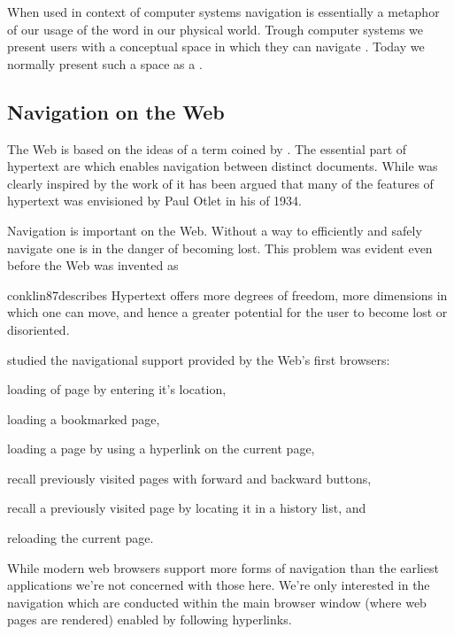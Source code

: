 When used in context of
computer systems navigation is essentially a metaphor of our usage of the
word in our physical world. Trough computer systems we present users with a
conceptual space in which they can navigate \citep[p.~189]{whiteside85}.
Today we normally present such a space as a %
.

\subsection{Navigation on the Web}
\label{section:background.navigation.navigation.on.the.web}

The Web is based on the ideas of \dash{}a term coined by
\citet[p.~86]{nelson65}. The essential part of hypertext are
 \citep[p.~90]{nelson65} which enables navigation between
distinct documents. While \citeauthor{nelson65} was clearly
inspired by the work of \citet{bush45} it has been argued \citep{rayward94}
that many of the features of hypertext was envisioned by Paul Otlet in his
 of 1934.

Navigation is important on the Web. Without a way to efficiently and safely
navigate one is in the danger of becoming lost. This problem was evident even
before the Web was invented as
\begin{fullquote}[p.~38]{conklin87}{describes}
  Hypertext offers more degrees of freedom, more dimensions in which one
  can move, and hence a greater potential for the user
  to become lost or disoriented.
\end{fullquote}

\citet{jones96} studied the navigational support provided by the Web's first
browsers:
\begin{inparaenum}[(i)]
  \item loading of page by entering it's location,
  \item loading a bookmarked page,
  \item loading a page by using a hyperlink on the current page,
  \item recall previously visited pages with forward and backward buttons,
  \item recall a previously visited page by locating it in a history list, and
  \item reloading the current page.
\end{inparaenum}
While modern web browsers support more forms of navigation%
than the earliest applications we're not concerned with those here.
We're only interested in the navigation which are conducted within the main
browser window (where web pages are rendered) enabled by following hyperlinks.

